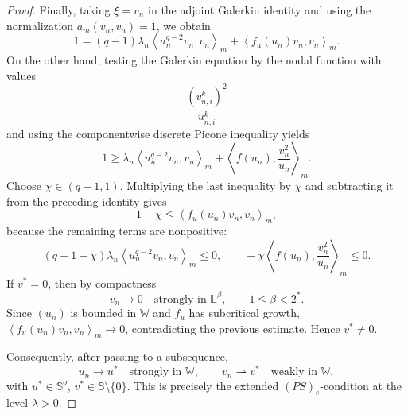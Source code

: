\documentclass[10pt,a4paper]{amsart}
\begin{document}
\begin{proof}
	Finally, taking \(\xi=v_n\) in the adjoint Galerkin identity and using the
	normalization \(a_m(v_n,v_n)=1\), we obtain
	\[
	1
	=
	(q-1)\lambda_n
	\left\langle u_n^{q-2}v_n,v_n\right\rangle_m
	+
	\left\langle f_u(u_n)v_n,v_n\right\rangle_m .
	\]
	On the other hand, testing the Galerkin equation by the nodal function with
	values
	\[
	\frac{(v_{n,i}^k)^2}{u_{n,i}^k}
	\]
	and using the componentwise discrete Picone inequality yields
	\[
	1
	\ge
	\lambda_n
	\left\langle u_n^{q-2}v_n,v_n\right\rangle_m
	+
	\left\langle f(u_n),\frac{v_n^2}{u_n}\right\rangle_m .
	\]
	Choose \(\chi\in(q-1,1)\). Multiplying the last inequality by \(\chi\) and
	subtracting it from the preceding identity gives
	\[
	1-\chi
	\le
	\left\langle f_u(u_n)v_n,v_n\right\rangle_m ,
	\]
	because the remaining terms are nonpositive:
	\[
	(q-1-\chi)\lambda_n
	\left\langle u_n^{q-2}v_n,v_n\right\rangle_m\le0,
	\qquad
	-\chi
	\left\langle f(u_n),\frac{v_n^2}{u_n}\right\rangle_m\le0 .
	\]
	If \(v^*=0\), then by compactness
	\[
	v_n\to0
	\quad\text{strongly in }\mathbb L^\beta,\qquad 1\le\beta<2^* .
	\]
	Since \((u_n)\) is bounded in \(\mathbb W\) and \(f_u\) has subcritical
	growth, \(\left\langle f_u(u_n)v_n,v_n\right\rangle_m\to0\),
	contradicting the previous estimate. Hence \(v^*\ne0\).
	
	Consequently, after passing to a subsequence,
	\[
	u_n\to u^*
	\quad\text{strongly in }\mathbb W,
	\qquad
	v_n\rightharpoonup v^*
	\quad\text{weakly in }\mathbb W,
	\]
	with \(u^*\in\mathbb S^o\), \(v^*\in\mathbb S\setminus\{0\}\). This is
	precisely the extended \((PS)_e\)-condition at the level \(\lambda>0\).
\end{proof}
\end{document}
